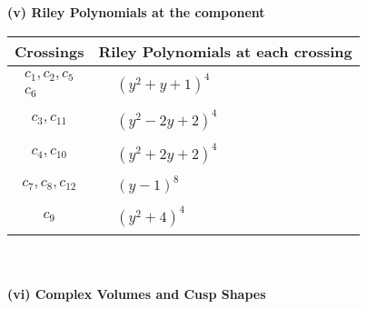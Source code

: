 \documentclass[1p]{elsarticle_modified}
\theoremstyle{definition}
\begin{document}
\newpage\renewcommand{\arraystretch}{1}
\flushleft \textbf{(v) Riley Polynomials at the component}\newline \\
\begin{tabular}{m{50pt}|m{274pt}}
Crossings & \hspace{64pt}Riley Polynomials at each crossing \\
\hline $$\begin{aligned}c_{1},c_{2},c_{5}\\c_{6}\end{aligned}$$&$\begin{aligned}
&(y^2+y+1)^4
\end{aligned}$\\
\hline $$\begin{aligned}c_{3},c_{11}\end{aligned}$$&$\begin{aligned}
&(y^2-2 y+2)^4
\end{aligned}$\\
\hline $$\begin{aligned}c_{4},c_{10}\end{aligned}$$&$\begin{aligned}
&(y^2+2 y+2)^4
\end{aligned}$\\
\hline $$\begin{aligned}c_{7},c_{8},c_{12}\end{aligned}$$&$\begin{aligned}
&(y-1)^8
\end{aligned}$\\
\hline $$\begin{aligned}c_{9}\end{aligned}$$&$\begin{aligned}
&(y^2+4)^4
\end{aligned}$\\
\hline
\end{tabular}\\~\\
\newpage\flushleft \textbf{(vi) Complex Volumes and Cusp Shapes}
\end{document}
